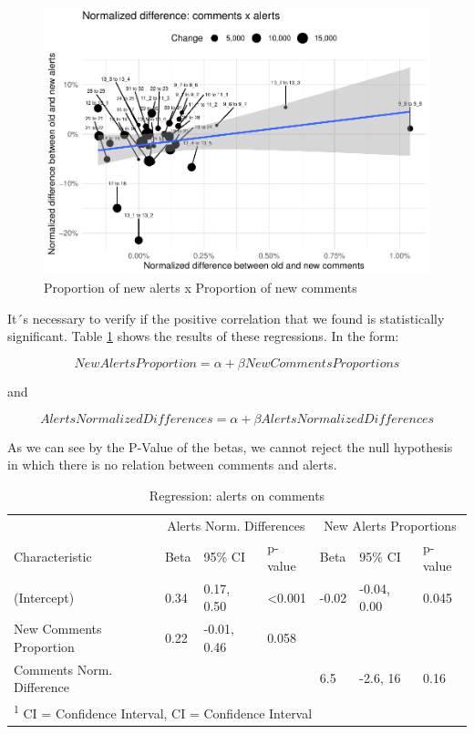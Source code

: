 \documentclass[
]{article}
\begin{document}
\begin{figure}
\centering
\includegraphics{report_files/figure-latex/unnamed-chunk-21-1.pdf}
\caption{\label{scatter_diff}Proportion of new alerts x Proportion of
new comments}
\end{figure}

\normalsize

It´s necessary to verify if the positive correlation that we found is
statistically significant. Table \ref{tab_reg} shows the results of
these regressions. In the form:

\[ NewAlertsProportion = \alpha + \beta NewCommentsProportions \]

and

\[ AlertsNormalizedDifferences = \alpha + \beta AlertsNormalizedDifferences \]

As we can see by the P-Value of the betas, we cannot reject the null
hypothesis in which there is no relation between comments and alerts.

\small

\begin{table}

\caption{\label{tab:unnamed-chunk-22}\label{tab_reg} Regression: alerts on comments}
\centering
\begin{tabular}[t]{l|l|l|l|l|l|l}
\hline
\multicolumn{1}{c|}{ } & \multicolumn{3}{c|}{Alerts Norm. Differences} & \multicolumn{3}{c}{New Alerts Proportions} \\
\cline{2-4} \cline{5-7}
Characteristic & Beta & 95\% CI & p-value & Beta & 95\% CI & p-value\\
\hline
(Intercept) & 0.34 & 0.17, 0.50 & <0.001 & -0.02 & -0.04, 0.00 & 0.045\\
\hline
New Comments Proportion & 0.22 & -0.01, 0.46 & 0.058 &  &  & \\
\hline
Comments Norm. Difference &  &  &  & 6.5 & -2.6, 16 & 0.16\\
\hline
\multicolumn{7}{l}{\textsuperscript{1} CI = Confidence Interval, CI = Confidence Interval}\\
\end{tabular}
\end{table}
\end{document}
